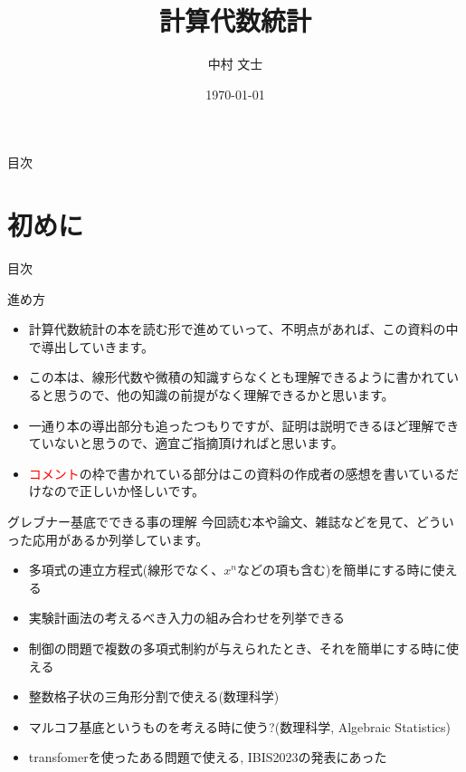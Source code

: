 \documentclass[aspectratio=169, dvipdfmx, 11pt]{beamer} %
\title[Short title]{計算代数統計}
\author[著者略称]{中村 文士}
\date{\today}
\newcommand{\red}[1]{\textcolor{red}{#1}}
\begin{document}
\maketitle

\begin{frame}{目次}
	\tableofcontents
\end{frame}

\section{初めに}
\begin{frame}{目次}
	\tableofcontents[currentsection]
\end{frame}

\begin{frame}{進め方}
	\begin{itemize}
		\item 計算代数統計の本を読む形で進めていって、不明点があれば、この資料の中で導出していきます。
		\item この本は、線形代数や微積の知識すらなくとも理解できるように書かれていると思うので、他の知識の前提がなく理解できるかと思います。
		\item 一通り本の導出部分も追ったつもりですが、証明は説明できるほど理解できていないと思うので、適宜ご指摘頂ければと思います。
		\item \red{コメント}の枠で書かれている部分はこの資料の作成者の感想を書いているだけなので正しいか怪しいです。
	\end{itemize}
\end{frame}

\begin{frame}{グレブナー基底でできる事の理解}
	今回読む本や論文、雑誌などを見て、どういった応用があるか列挙しています。
	\begin{itemize}
		\item 多項式の連立方程式(線形でなく、$x^n$などの項も含む)を簡単にする時に使える
		\item 実験計画法の考えるべき入力の組み合わせを列挙できる
		\item 制御の問題で複数の多項式制約が与えられたとき、それを簡単にする時に使える
		\item 整数格子状の三角形分割で使える(数理科学)
		\item マルコフ基底というものを考える時に使う?(数理科学, Algebraic Statistics)
		\item transfomerを使ったある問題で使える, IBIS2023の発表にあった
	\end{itemize}
\end{frame}
\end{document}
